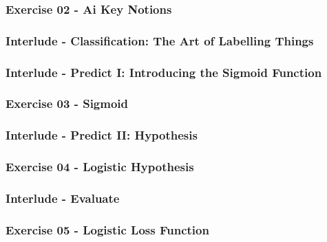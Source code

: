 \documentclass[]{article}
\begin{document}
\hypertarget{exercise-02---ai-key-notions}{%
\subsubsection{Exercise 02 - Ai Key
Notions}\label{exercise-02---ai-key-notions}}

\hypertarget{interlude---classification-the-art-of-labelling-things}{%
\subsubsection{Interlude - Classification: The Art of Labelling
Things}\label{interlude---classification-the-art-of-labelling-things}}

\hypertarget{interlude---predict-i-introducing-the-sigmoid-function}{%
\subsubsection{Interlude - Predict I: Introducing the Sigmoid
Function}\label{interlude---predict-i-introducing-the-sigmoid-function}}

\hypertarget{exercise-03---sigmoid}{%
\subsubsection{Exercise 03 - Sigmoid}\label{exercise-03---sigmoid}}

\hypertarget{interlude---predict-ii-hypothesis}{%
\subsubsection{Interlude - Predict II:
Hypothesis}\label{interlude---predict-ii-hypothesis}}

\hypertarget{exercise-04---logistic-hypothesis}{%
\subsubsection{Exercise 04 - Logistic
Hypothesis}\label{exercise-04---logistic-hypothesis}}

\hypertarget{interlude---evaluate}{%
\subsubsection{Interlude - Evaluate}\label{interlude---evaluate}}

\hypertarget{exercise-05---logistic-loss-function}{%
\subsubsection{Exercise 05 - Logistic Loss
Function}\label{exercise-05---logistic-loss-function}}
\end{document}
